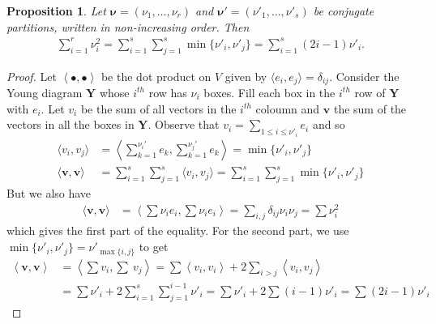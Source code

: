 \documentclass[paper=a4, fontsize=10pt]{amsart} %
\theoremstyle{plain}
\newtheorem{prop}[subsection]{Proposition}
\theoremstyle{definition}
\theoremstyle{remark}
\numberwithin{equation}{section} %
\numberwithin{figure}{section} %
\numberwithin{table}{section} %
\numberwithin{subsection}{section} %
\newif\ifdraft
\def\e{\ensuremath e}
\begin{document}
\ifminuscule
\def\e{\ensuremath{e}}
\begin{prop}
Let $\boldsymbol{\nu}=(\nu_1,\ldots,\nu_r)$ and $\boldsymbol{\nu'}=(\nu'_1,\ldots,\nu'_s)$ be conjugate partitions, written in non-increasing order. 
Then \begin{align*}
    \sum\limits_{i=1}^r\nu_i^2=\sum\limits_{i=1}^s\sum\limits_{j=1}^s\min\{\nu'_i,\nu'_j\}=\sum\limits_{i=1}^s(2i-1)\nu'_i.
\end{align*}
\end{prop}
\begin{proof}
Let $\left\langle\bullet,\bullet\right\rangle$ be the dot product on $V$ given by $\langle \e_i,\e_j\rangle=\delta_{ij}$. 
Consider the Young diagram $\mathrm{\mathbf Y}$ whose $i^{th}$ row has $\nu_i$ boxes. 
Fill each box in the $i^{th}$ row of $\mathrm{\mathbf Y}$ with $\e_i$.
Let $v_i$ be the sum of all vectors in the $i^{th}$ coloumn and $\mathbf{v}$ the sum of the vectors in all the boxes in $\mathrm{\mathbf Y}$. 
Observe that $
    v_i =\sum\limits_{1\leq i\leq\nu'_i}\e_i$
and so\begin{align*}
    \langle v_i, v_j\rangle &=\left\langle\sum\limits_{k=1}^{\nu_i'}\e_k,\sum\limits_{k=1}^{\nu_j'}\e_k\right\rangle%
                            =\min\{\nu'_i,\nu'_j\}\\
    \langle\mathbf v,\mathbf v\rangle   &=\sum\limits_{i=1}^s\sum\limits_{j=1}^s\langle v_i,v_j\rangle=\sum\limits_{i=1}^s\sum\limits_{j=1}^s\min\{\nu'_i,\nu'_j\}
\end{align*}
But we also have \begin{align*}
    \langle\mathbf{v},\mathbf v\rangle  &=\left\langle\sum\nu_i\e_i,\sum\nu_i\e_i\right\rangle
                                        =\sum\limits_{i,j}\delta_{ij}\nu_i\nu_j=\sum\nu_i^2 
\end{align*}
which gives the first part of the equality.
For the second part, we use $\min\{\nu'_i,\nu'_j\}=\nu'_{\max\{i,j\}}$ to get \begin{align*}
    \left\langle\mathbf v,\mathbf v\right\rangle    &=\left\langle\sum v_i,\sum\ v_j\right\rangle
                                                    =\sum\left\langle v_i, v_i\right\rangle+2\sum\limits_{i>j}\left\langle v_i, v_j\right\rangle\\
                                                    &=\sum\nu'_i+2\sum\limits_{i=1}^s\sum\limits_{j=1}^{i-1}\nu'_i 
                                                    =\sum\nu'_i+2\sum(i-1)\nu'_i
                                                    =\sum(2i-1)\nu'_i
\end{align*}
\end{proof}
\ifdraft\marginpar{appendix.tex}\fi
\end{document}
